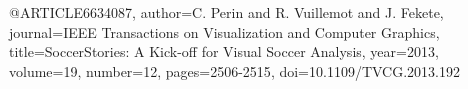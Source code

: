 @ARTICLE{6634087,
  author={C. {Perin} and R. {Vuillemot} and J. {Fekete}},
  journal={IEEE Transactions on Visualization and Computer Graphics}, 
  title={SoccerStories: A Kick-off for Visual Soccer Analysis}, 
  year={2013},
  volume={19},
  number={12},
  pages={2506-2515},
  doi={10.1109/TVCG.2013.192}}